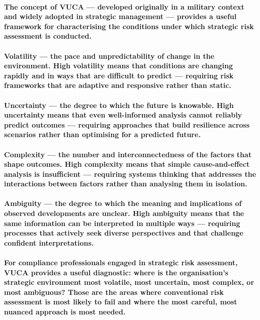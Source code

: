 \paragraph{The concept of \textbf{VUCA} — developed originally in a military context and widely adopted in strategic management — provides a useful framework for characterising the conditions under which strategic risk assessment is conducted.}
\paragraph{\textbf{Volatility} — the pace and unpredictability of change in the environment. High volatility means that conditions are changing rapidly and in ways that are difficult to predict — requiring risk frameworks that are adaptive and responsive rather than static.}
\paragraph{\textbf{Uncertainty} — the degree to which the future is knowable. High uncertainty means that even well-informed analysis cannot reliably predict outcomes — requiring approaches that build resilience across scenarios rather than optimising for a predicted future.}
\paragraph{\textbf{Complexity} — the number and interconnectedness of the factors that shape outcomes. High complexity means that simple cause-and-effect analysis is insufficient — requiring systems thinking that addresses the interactions between factors rather than analysing them in isolation.}
\paragraph{\textbf{Ambiguity} — the degree to which the meaning and implications of observed developments are unclear. High ambiguity means that the same information can be interpreted in multiple ways — requiring processes that actively seek diverse perspectives and that challenge confident interpretations.}
\paragraph{For compliance professionals engaged in strategic risk assessment, VUCA provides a useful diagnostic: where is the organisation's strategic environment most volatile, most uncertain, most complex, or most ambiguous? Those are the areas where conventional risk assessment is most likely to fail and where the most careful, most nuanced approach is most needed.}


